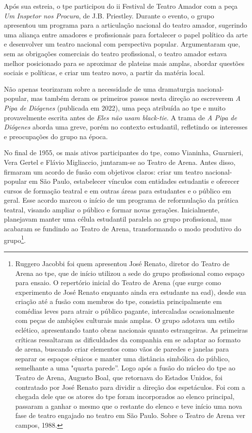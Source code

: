 Após sua estreia, o {\sc tpe} participou do {\sc ii} Festival de Teatro Amador com a
peça {\it Um Inspetor nos Procura}, de J.B. Priestley. Durante o evento,
o grupo apresentou um programa para a articulação nacional do teatro
amador, sugerindo uma aliança entre amadores e profissionais para
fortalecer o papel político da arte e desenvolver um teatro nacional com
perspectiva popular. Argumentaram que, sem as obrigações comerciais do
teatro profissional, o teatro amador estava melhor posicionado para se
aproximar de plateias mais amplas, abordar questões sociais e políticas,
e criar um teatro novo, a partir da matéria local.

Não apenas teorizaram sobre a necessidade de uma dramaturgia
nacional-popular, mas também deram os primeiros passos nesta direção ao
escreverem {\it A Pipa de Diógenes} (publicada em 2022), uma peça
atribuída ao {\sc tpe} e muito provavelmente escrita antes de {\it Eles não
usam black-tie}. A trama de {\it A Pipa de Diógenes} aborda uma greve,
porém no contexto estudantil, refletindo os interesses e preocupações do
grupo na época.

No final de 1955, os mais ativos participantes do {\sc tpe}, como Vianinha,
Guarnieri, Vera Gertel e Flávio Migliaccio, juntaram-se ao Teatro de
Arena. Antes disso, firmaram um acordo de fusão com objetivos claros:
criar um teatro nacional-popular em São Paulo, estabelecer vínculos com
entidades estudantis e oferecer cursos de formação teatral e em outras
áreas para estudantes e o público em geral. Esse acordo marcou o início
de um programa de reformulação da prática teatral, visando ampliar o
público e formar novas gerações. Inicialmente, planejavam manter uma
célula estudantil paralela ao grupo profissional, mas acabaram se
fundindo ao Teatro de Arena, transformando o modo produtivo do
grupo\footnote{Ruggero Jacobbi foi quem apresentou José Renato, diretor
  do Teatro de Arena ao {\sc tpe}, que de início utilizou a sede do grupo
  profissional como espaço para ensaio. O repertório inicial do Teatro
  de Arena (que surge como experimento de José Renato enquanto ainda era
  estudante na {\sc ead}), desde sua criação até a fusão com membros do {\sc tpe},
  consistia principalmente em comédias leves para atrair o público
  pagante, intercaladas ocasionalmente com peças de ambições culturais
  mais amplas. O grupo adotava um estilo eclético, apresentando tanto
  obras nacionais quanto estrangeiras. As primeiras críticas ressaltaram
  as dificuldades da companhia em se adaptar ao formato de arena,
  buscando criar elementos como vãos de paredes e janelas para separar
  os espaços cênicos e manter uma distância simbólica do público,
  semelhante a uma "quarta parede”. Logo após a fusão do núcleo do {\sc tpe}
  ao Teatro de Arena, Augusto Boal, que retornava do Estados Unidos, foi
  contratado por José Renato para dividir a direção dos espetáculos. Foi
  com a chegada dele que os atores do {\sc tpe} foram incorporados ao elenco
  principal, passaram a ganhar o mesmo que o restante do elenco e teve
  início uma nova fase de teatro engajado no teatro em São Paulo. Sobre
  o Teatro de Arena ver {\sc campos}, 1988.}.

